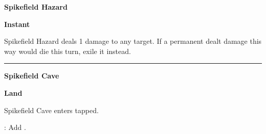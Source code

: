 \documentclass[8pt]{extarticle}
\begin{document}
{\large\textbf{Spikefield Hazard}}
\hfill
\R

\textbf{Instant}

Spikefield Hazard deals 1 damage to any target. If a permanent dealt damage this way would die this turn, exile it instead.

\vfill
\hrule
\vfill

{\large\textbf{Spikefield Cave}}

\textbf{Land}

Spikefield Cave enters tapped.

\T: Add \R.
\end{document}
